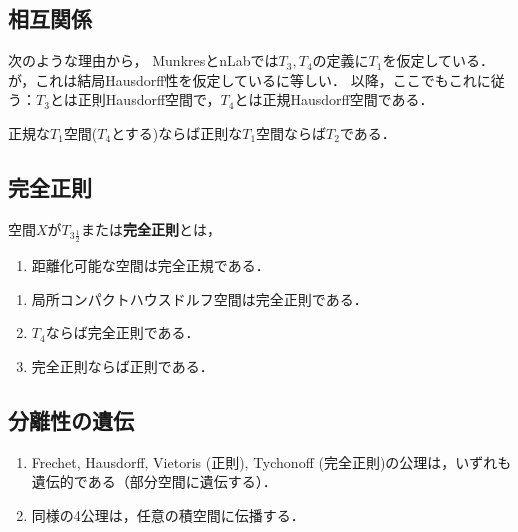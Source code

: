 \documentclass[uplatex,dvipdfmx]{jsreport}
\begin{document}
\subsection{相互関係}

\begin{tcolorbox}[colframe=ForestGreen, colback=ForestGreen!10!white,breakable,colbacktitle=ForestGreen!40!white,coltitle=black,fonttitle=\bfseries\sffamily,
title=]
    次のような理由から，
    Munkres\cite{Munkres}とnLabでは$T_3,T_4$の定義に$T_1$を仮定している．
    が，これは結局Hausdorff性を仮定しているに等しい．
    以降，ここでもこれに従う：$T_3$とは正則Hausdorff空間で，$T_4$とは正規Hausdorff空間である．
\end{tcolorbox}

\begin{proposition}
    正規な$T_1$空間($T_4$とする)ならば正則な$T_1$空間ならば$T_2$である．
\end{proposition}

\subsection{完全正則}

\begin{definition}
    空間$X$が$T_{3\frac{1}{2}}$または\textbf{完全正則}とは，
    \begin{enumerate}
        \item 距離化可能な空間は完全正規である．
    \end{enumerate}
\end{definition}

\begin{proposition}\mbox{}
    \begin{enumerate}
        \item 局所コンパクトハウスドルフ空間は完全正則である．
        \item $T_4$ならば完全正則である．
        \item 完全正則ならば正則である．
    \end{enumerate}
\end{proposition}

\subsection{分離性の遺伝}

\begin{proposition}\mbox{}
    \begin{enumerate}
        \item Frechet, Hausdorff, Vietoris (正則), Tychonoff (完全正則)の公理は，いずれも遺伝的である（部分空間に遺伝する）．
        \item 同様の4公理は，任意の積空間に伝播する．
    \end{enumerate}
\end{proposition}
\end{document}
